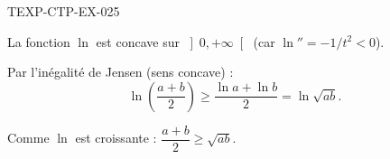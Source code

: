 \begin{corrige}{TEXP-CTP-EX-025}

La fonction $\ln$ est concave sur $\left]0, +\infty\right[$ (car $\ln'' = -1/t^2 < 0$).


Par l'inégalité de Jensen (sens concave) :
\[ \ln\!\left(\frac{a+b}{2}\right) \geq \frac{\ln a + \ln b}{2} = \ln\sqrt{ab}. \]

Comme $\ln$ est croissante : $\dfrac{a+b}{2} \geq \sqrt{ab}$.

\end{corrige}
